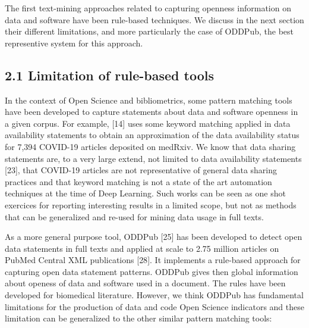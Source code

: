 \documentclass[
]{article}
\begin{document}
The first text-mining approaches related to capturing openness
information on data and software have been rule-based techniques. We
discuss in the next section their different limitations, and more
particularly the case of ODDPub, the best representive system for this
approach.

\hypertarget{limitation-of-rule-based-tools}{%
\subsection{2.1 Limitation of rule-based
tools}\label{limitation-of-rule-based-tools}}

In the context of Open Science and bibliometrics, some pattern matching
tools have been developed to capture statements about data and software
openness in a given corpus. For example, {[}14{]} uses some keyword
matching applied in data availability statements to obtain an
approximation of the data availability status for 7,394 COVID-19
articles deposited on medRxiv. We know that data sharing statements are,
to a very large extend, not limited to data availability statements
{[}23{]}, that COVID-19 articles are not representative of general data
sharing practices and that keyword matching is not a state of the art
automation techniques at the time of Deep Learning. Such works can be
seen as one shot exercices for reporting interesting results in a
limited scope, but not as methods that can be generalized and re-used
for mining data usage in full texts.

As a more general purpose tool, ODDPub {[}25{]} has been developed to
detect open data statements in full texts and applied at scale to 2.75
million articles on PubMed Central XML publications {[}28{]}. It
implements a rule-based approach for capturing open data statement
patterns. ODDPub gives then global information about openess of data and
software used in a document. The rules have been developed for
biomedical literature. However, we think ODDPub has fundamental
limitations for the production of data and code Open Science indicators
and these limitation can be generalized to the other similar pattern
matching tools:
\end{document}
